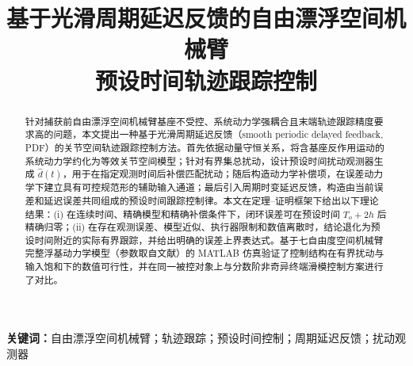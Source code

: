 \documentclass[UTF8,a4paper,12pt]{ctexart}
\title{基于光滑周期延迟反馈的自由漂浮空间机械臂\\预设时间轨迹跟踪控制}
\date{}
\theoremstyle{definition}
\theoremstyle{plain}
\theoremstyle{remark}
\begin{document}
\maketitle

\begin{abstract}
针对捕获前自由漂浮空间机械臂基座不受控、系统动力学强耦合且末端轨迹跟踪精度要求高的问题，本文提出一种基于光滑周期延迟反馈（smooth periodic delayed feedback, PDF）的关节空间轨迹跟踪控制方法。首先依据动量守恒关系，将含基座反作用运动的系统动力学约化为等效关节空间模型；针对有界集总扰动，设计预设时间扰动观测器生成 \(\hat d(t)\)，用于在指定观测时间后补偿匹配扰动；随后构造动力学补偿项，在误差动力学下建立具有可控规范形的辅助输入通道；最后引入周期时变延迟反馈，构造由当前误差和延迟误差共同组成的预设时间跟踪控制律。本文在定理--证明框架下给出以下理论结果：(i) 在连续时间、精确模型和精确补偿条件下，闭环误差可在预设时间 \(T_o+2h\) 后精确归零；(ii) 在存在观测误差、模型近似、执行器限制和数值离散时，结论退化为预设时间附近的实际有界跟踪，并给出明确的误差上界表达式。基于七自由度空间机械臂完整浮基动力学模型（参数取自文献）的 MATLAB 仿真验证了控制结构在有界扰动与输入饱和下的数值可行性，并在同一被控对象上与分数阶非奇异终端滑模控制方案进行了对比。
\end{abstract}

\noindent\textbf{关键词：}自由漂浮空间机械臂；轨迹跟踪；预设时间控制；周期延迟反馈；扰动观测器






% 


\printbibliography[title={参考文献}]
\end{document}
